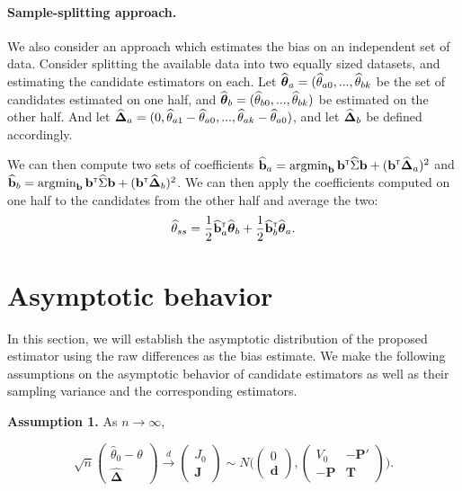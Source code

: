 \documentclass{article}
\begin{document}
\paragraph{Sample-splitting approach.}
We also consider an approach which estimates the bias on an independent set of data. Consider splitting the available data into two equally sized datasets, and estimating the candidate estimators on each. Let ${\widehat{\boldsymbol{\theta}}}_a = ({\widehat\theta}_{a0}, ..., {\widehat\theta}_{bk}$ be the set of candidates estimated on one half, and ${\widehat{\boldsymbol{\theta}}}_b = ({\widehat\theta}_{b0}, ..., {\widehat\theta}_{bk})$ be estimated on the other half. And let ${\widehat{\boldsymbol{\Delta}}}_a = (0, {\widehat\theta}_{a1} - {\widehat\theta}_{a0}, ..., {\widehat\theta}_{ak} - {\widehat\theta}_{a0})$, and let ${\widehat{\boldsymbol{\Delta}}}_b$ be defined accordingly. 

We can then compute two sets of coefficients ${\widehat {{\bf b}}}_a = \mathop{\mbox{argmin}}_{{\bf b}}{\bf b}^{{\sf \scriptscriptstyle{T}}}{\widehat\Sigma}{\bf b} + ({\bf b}^{{\sf \scriptscriptstyle{T}}} {\widehat{\boldsymbol{\Delta}}}_a)^2$ and ${\widehat {{\bf b}}}_b = \mathop{\mbox{argmin}}_{{\bf b}}{\bf b}^{{\sf \scriptscriptstyle{T}}}{\widehat\Sigma}{\bf b} + ({\bf b}^{{\sf \scriptscriptstyle{T}}} {\widehat{\boldsymbol{\Delta}}}_b)^2$. We can then apply the coefficients computed on one half to the candidates from the other half and average the two:
\[
{\widehat\theta}_{ss} = \frac{1}{2}{\widehat {{\bf b}}}_a^{{\sf \scriptscriptstyle{T}}}{\widehat{\boldsymbol{\theta}}}_b + \frac{1}{2}{\widehat {{\bf b}}}_b^{{\sf \scriptscriptstyle{T}}}{\widehat{\boldsymbol{\theta}}}_a.
\]

\section{Asymptotic behavior}
In this section, we will establish the asymptotic distribution of the proposed estimator using the raw differences as the bias estimate. We make the following assumptions on the asymptotic behavior of candidate estimators as well as their sampling variance and the corresponding estimators. 

\begin{flushleft}
\textbf{Assumption 1.}  As $n \to \infty$, 
\end{flushleft}
\begin{displaymath}
\sqrt{n}  \begin{pmatrix} \hat\theta_0 - \theta \\  \boldsymbol{\hat \Delta} \end{pmatrix} \xrightarrow{d} 
\begin{pmatrix} J_0 \\ \mathbf J \end{pmatrix} \sim
    N\Bigg( \begin{pmatrix} 0 \\ \mathbf d  \end{pmatrix},  \begin{pmatrix}    V_0 & -\mathbf P'  \\
                             -\mathbf P  & \mathbf T  \end{pmatrix} \Bigg).
\end{displaymath}
\end{document}
